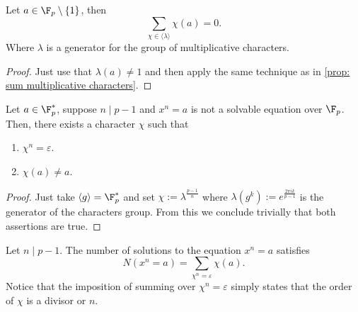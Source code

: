 \begin{proposition}
   Let \(a \in \F_p \setminus \{1\} \), then 
    \[
       \sum_{\chi \in \langle \lambda \rangle} \chi(a) = 0.
   \] 
   Where \(\lambda\) is a generator for the group of multiplicative characters.
\end{proposition}

\begin{proof}
   Just use that \(\lambda(a) \neq 1\) and then apply the same technique as in
   \ref{prop: sum multiplicative characters}.
\end{proof}

\begin{proposition}
   Let \(a \in \F_p^\ast\), suppose \(n \mid p-1\) and \(x^n = a\) is not a
   solvable equation over \(\F_p\). Then, there exists a character \(\chi\)
   such that 
   \begin{enumerate}
      \item \(\chi^n = \varepsilon\).
      \item \(\chi(a) \neq  a\).
   \end{enumerate}
\end{proposition}

\begin{proof}
   Just take \(\langle g \rangle = \F_p^\ast\) and set \(\chi :=
   \lambda^{\frac{p-1}{n}}\) where \(\lambda(g^k) := e^{\frac{2 \pi i k}{p-1}}\)
   is the generator of the characters group. From this we conclude trivially
   that both assertions are true.
\end{proof}

\begin{proposition}
   Let \(n \mid p-1\). The number of solutions to the equation \(x^n = a\) 
   satisfies
   \[
      N(x^n=a) = \sum_{\chi^n = \varepsilon} \chi(a).
   \] 
   Notice that the imposition of summing over \(\chi^n = \varepsilon\) simply
   states that the order of \(\chi\) is a divisor or \(n\).
\end{proposition}

